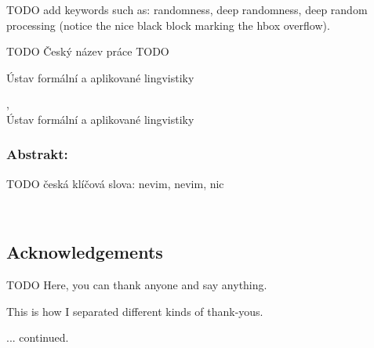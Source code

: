 \documentclass[12pt,notitlepage,a4paper,openright]{report}
\begin{document}


\begin{description}[leftmargin=7.5em,labelwidth=7em,labelindent=0em,labelsep=0.5em]
\item[Keywords:] TODO add keywords such as: randomness, deep randomness, deep random processing (notice the nice black block marking the hbox overflow).
\end{description}


\cleardoublepage{}
\begin{description}[leftmargin=7.5em,labelwidth=7em,labelindent=0em,labelsep=0.5em]
\item[Název práce:] TODO Český název práce TODO
\item[Autor:] \theauthor{}
\item[Katedra:] Ústav formální a aplikované lingvistiky
\item[Vedoucí práce:] \thesupervisor,\\ Ústav formální a aplikované lingvistiky
\end{description}

\subsubsection{Abstrakt:}



\begin{description}[leftmargin=7.5em,labelwidth=7em,labelindent=0em,labelsep=0.5em]
%
\item[Klíčová slova:] TODO česká klíčová slova: nevim, nevim, nic
%
\end{description}





\cleardoublepage{}
\ \vspace{10mm}

\subsection*{Acknowledgements}

{ TODO Here, you can thank anyone and say anything.

  \vspace{1\baselineskip}
  \noindent
  This is how I separated different kinds of thank-yous.

  \vspace{1\baselineskip}
  \noindent
  ... continued. }
\end{document}
